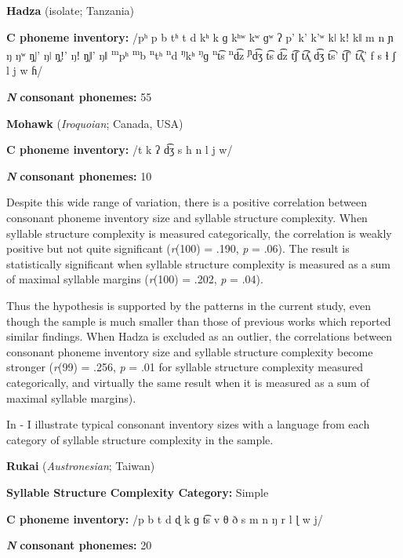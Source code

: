 \ea\label{ex:4.20}
   \textbf{Hadza} (isolate; Tanzania)

\textbf{C phoneme inventory:} /pʰ p b tʰ t d kʰ k ɡ kʰʷ kʷ ɡʷ ʔ p’ k’ k’ʷ kǀ kǃ kǁ m n ɲ ŋ ŋʷ ŋ̥ǀ’ ŋǀ ŋ̥ǃ’ ŋǃ ŋ̥ǁ’ ŋǁ \textsuperscript{m}pʰ \textsuperscript{m}b \textsuperscript{n}tʰ \textsuperscript{n}d \textsuperscript{ŋ}kʰ \textsuperscript{ŋ}ɡ \textsuperscript{n}t͡s \textsuperscript{n}d͡z \textsuperscript{ɲ}d͡ʒ t͡s d͡z t͡ʃ t͡ʎ̥ d͡ʒ t͡s’ t͡ʃ’ t͡ʎ̥’ f s ɬ ʃ l j w ɦ/

\textbf{\textit{N}} \textbf{consonant phonemes:} 55
\z

\ea\label{ex:4.21}
  \textbf{Mohawk} (\textit{Iroquoian}; Canada, USA)

\textbf{C phoneme inventory:} /t k ʔ d͡ʒ s h n l j w/

\textbf{\textit{N}} \textbf{consonant phonemes:} 10
\z

  Despite this wide range of variation, there is a positive correlation between consonant phoneme inventory size and syllable structure complexity. When syllable structure complexity is measured categorically, the correlation is weakly positive but not quite significant (\textit{r}(100) = .190, \textit{p} = .06). The result is statistically significant when syllable structure complexity is measured as a sum of maximal syllable margins (\textit{r}(100) = .202, \textit{p} = .04).

  Thus the hypothesis is supported by the patterns in the current study, even though the sample is much smaller than those of previous works which reported similar findings. When Hadza is excluded as an outlier, the correlations between consonant phoneme inventory size and syllable structure complexity become stronger (\textit{r}(99) = .256, \textit{p} = .01 for syllable structure complexity measured categorically, and virtually the same result when it is measured as a sum of maximal syllable margins).

  In - I illustrate typical consonant inventory sizes with a language from each category of syllable structure complexity in the sample.

\ea\label{ex:4.22}
  \textbf{Rukai} (\textit{Austronesian}; Taiwan)

\textbf{Syllable Structure Complexity Category:} Simple

\textbf{C phoneme inventory:} /p b t d ɖ k ɡ t͡s v θ ð s m n ŋ r l ɭ w j/

\textbf{\textit{N}} \textbf{consonant phonemes:} 20
\z


